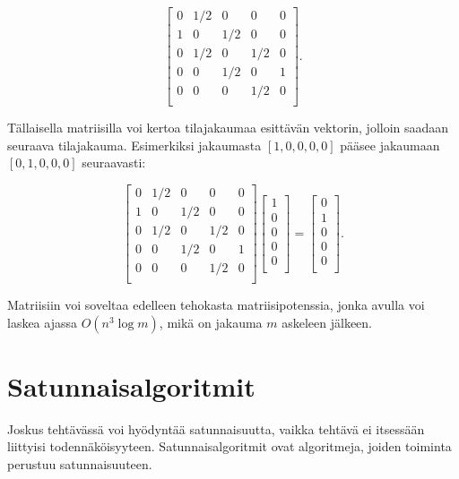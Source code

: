 \[ 
 \begin{bmatrix}
  0 & 1/2 & 0 & 0 & 0 \\
  1 & 0 & 1/2 & 0 & 0 \\
  0 & 1/2 & 0 & 1/2 & 0 \\
  0 & 0 & 1/2 & 0 & 1 \\
  0 & 0 & 0 & 1/2 & 0 \\
 \end{bmatrix}.
\]

Tällaisella matriisilla voi kertoa tilajakaumaa esittävän
vektorin, jolloin saadaan seuraava tilajakauma.
Esimerkiksi jakaumasta $[1,0,0,0,0]$ pääsee jakaumaan
$[0,1,0,0,0]$ seuraavasti:

\[ 
 \begin{bmatrix}
  0 & 1/2 & 0 & 0 & 0 \\
  1 & 0 & 1/2 & 0 & 0 \\
  0 & 1/2 & 0 & 1/2 & 0 \\
  0 & 0 & 1/2 & 0 & 1 \\
  0 & 0 & 0 & 1/2 & 0 \\
 \end{bmatrix}
 \begin{bmatrix}
  1 \\
  0 \\
  0 \\
  0 \\
  0 \\
 \end{bmatrix}
=
 \begin{bmatrix}
  0 \\
  1 \\
  0 \\
  0 \\
  0 \\
 \end{bmatrix}.
\]

Matriisiin voi soveltaa edelleen tehokasta
matriisipotenssia, jonka avulla voi laskea
ajassa $O(n^3 \log m)$,
mikä on jakauma $m$ askeleen jälkeen.

\section{Satunnaisalgoritmit}


Joskus tehtävässä voi hyödyntää satunnaisuutta,
vaikka tehtävä ei itsessään liittyisi todennäköisyyteen.
Satunnaisalgoritmit ovat algoritmeja, joiden toiminta
perustuu satunnaisuuteen.

